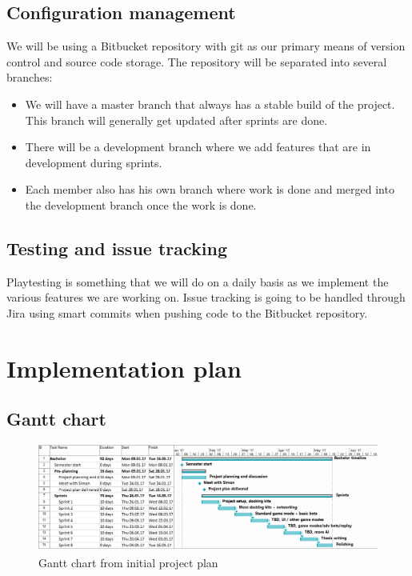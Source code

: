 \subsection*{Configuration management}
We will be using a Bitbucket repository with git as our primary means of version control and source code storage. The repository will be separated into several branches: 
\begin{itemize}
    \item We will have a master branch that always has a stable build of the project. This branch will generally get updated after sprints are done.
    \item There will be a development branch where we add features that are in development during sprints.
    \item Each member also has his own branch where work is done and merged into the development branch once the work is done. 
\end{itemize}

\subsection*{Testing and issue tracking}
Playtesting is something that we will do on a daily basis as we implement the various features we are working on. 
Issue tracking is going to be handled through Jira using smart commits when pushing code to the Bitbucket repository.

\section{Implementation plan}
\subsection*{Gantt chart}
\begin{figure}[thpb]
    \centering
    \includegraphics[width=1\textwidth]{images/gantt}
    \caption{Gantt chart from initial project plan}
    \label{fig:gantt}
\end{figure}

